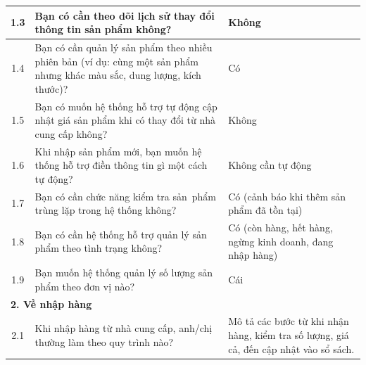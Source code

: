 \documentclass[a4paper,12pt]{report}
\begin{document}
\begin{longtable}{|c|p{8cm}|p{7cm}|}
    \hline
    1.3          & Bạn có cần theo dõi lịch sử thay đổi thông tin sản phẩm không?                                                          & Không                                                                                                                    \\
    \hline
    1.4          & Bạn có cần quản lý sản phẩm theo nhiều phiên bản (ví dụ: cùng một sản phẩm nhưng khác màu sắc, dung lượng, kích thước)? & Có                                                                                                                       \\
    \hline
    1.5          & Bạn có muốn hệ thống hỗ trợ tự động cập nhật giá sản phẩm khi có thay đổi từ nhà cung cấp không?                        & Không                                                                                                                    \\
    \hline
    1.6          & Khi nhập sản phẩm mới, bạn muốn hệ thống hỗ trợ điền thông tin gì một cách tự động?                                     & Không cần tự động                                                                                                        \\
    \hline
    1.7          & Bạn có cần chức năng kiểm tra sản~phẩm trùng lặp trong hệ thống không?                                                  & Có (cảnh báo khi thêm sản phẩm đã tồn tại)                                                                               \\
    \hline
    1.8          & Bạn có cần hệ thống hỗ trợ quản lý sản phẩm theo tình trạng không?                                                      & Có (còn hàng, hết hàng, ngừng kinh doanh, đang nhập hàng)                                                                \\
    \hline
    1.9          & Bạn muốn hệ thống quản lý số lượng sản phẩm theo đơn vị nào?                                                            & Cái                                                                                                                      \\
    \hline
    \multicolumn{3}{|l|}{\textbf{2. Về nhập hàng}}                                                                                                                                                                                                                    \\
    \hline
    2.1          & Khi nhập hàng từ nhà cung cấp, anh/chị thường làm theo quy trình nào?                                                   & Mô tả các bước từ khi nhận hàng, kiểm tra số lượng, giá cả, đến cập nhật vào sổ sách.                                    \\

\end{longtable}
\end{document}
